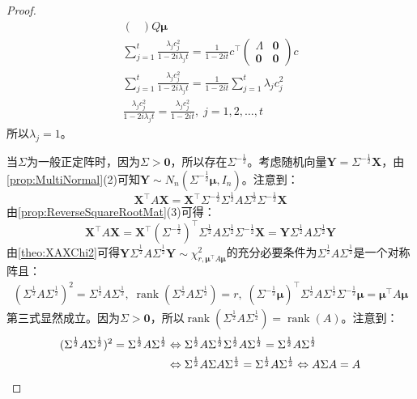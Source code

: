 \begin{proof}
\begin{gather*}
\begin{pmatrix}
		\end{pmatrix}
		Q\boldsymbol{\mu} \\
		\sum_{j=1}^{t}\frac{\lambda_jc_j^2}{1-2i\lambda_jt}=\frac{1}{1-2it}c^{\top}
		\begin{pmatrix}
			\varLambda & \mathbf{0} \\
			\mathbf{0} & \mathbf{0}
		\end{pmatrix}
		c \\
		\sum_{j=1}^{t}\frac{\lambda_jc_j^2}{1-2i\lambda_jt}=\frac{1}{1-2it}\sum_{j=1}^{t}\lambda_jc_j^2 \\
		\frac{\lambda_jc_j^2}{1-2i\lambda_jt}=\frac{\lambda_jc_j^2}{1-2it},\;j=1,2,\dots,t
	\end{gather*}
	所以$\lambda_j=1$。\par
	当$\Sigma$为一般正定阵时，因为$\Sigma>\mathbf{0}$，所以存在$\Sigma^{-\frac{1}{2}}$。考虑随机向量$\mathbf{Y}=\Sigma^{-\frac{1}{2}}\mathbf{X}$，由\cref{prop:MultiNormal}(2)可知$\mathbf{Y}\sim N_n(\Sigma^{-\frac{1}{2}}\boldsymbol{\mu},I_n)$。注意到：
	\begin{equation*}
		\mathbf{X}^{\top}A\mathbf{X}=\mathbf{X}^{\top}\Sigma^{-\frac{1}{2}}\Sigma
		^{\frac{1}{2}}A\Sigma^{\frac{1}{2}}\Sigma^{-\frac{1}{2}}\mathbf{X}
	\end{equation*}
	由\cref{prop:ReverseSquareRootMat}(3)可得：
	\begin{equation*}
		\mathbf{X}^{\top}A\mathbf{X}=\mathbf{X}^{\top}(\Sigma^{-\frac{1}{2}})^{\top}\Sigma
		^{\frac{1}{2}}A\Sigma^{\frac{1}{2}}\Sigma^{-\frac{1}{2}}\mathbf{X}=\mathbf{Y}\Sigma
		^{\frac{1}{2}}A\Sigma^{\frac{1}{2}}\mathbf{Y}
	\end{equation*}
	由\cref{theo:XAXChi2}可得$\mathbf{Y}\Sigma
	^{\frac{1}{2}}A\Sigma^{\frac{1}{2}}\mathbf{Y}\sim\chi_{r,\boldsymbol{\mu}^{\top}A\boldsymbol{\mu}}^2$的充分必要条件为$\Sigma
	^{\frac{1}{2}}A\Sigma^{\frac{1}{2}}$是一个对称阵且：
	\begin{gather*}
		(\Sigma
		^{\frac{1}{2}}A\Sigma^{\frac{1}{2}})^2=\Sigma
		^{\frac{1}{2}}A\Sigma^{\frac{1}{2}},\;
		\operatorname{rank}(\Sigma
		^{\frac{1}{2}}A\Sigma^{\frac{1}{2}})=r,\;
		(\Sigma^{-\frac{1}{2}}\boldsymbol{\mu})^{\top}\Sigma^{\frac{1}{2}} A\Sigma^{\frac{1}{2}}\Sigma^{-\frac{1}{2}}\boldsymbol{\mu}=\boldsymbol{\mu}^{\top}A\boldsymbol{\mu}
	\end{gather*}
	第三式显然成立。因为$\Sigma>\mathbf{0}$，所以$\operatorname{rank}(\Sigma
	^{\frac{1}{2}}A\Sigma^{\frac{1}{2}})=\operatorname{rank}(A)$。注意到：
	\begin{align*}
		(\Sigma
		^{\frac{1}{2}}A\Sigma^{\frac{1}{2}})^2=\Sigma
		^{\frac{1}{2}}A\Sigma^{\frac{1}{2}}&\Leftrightarrow
		\Sigma
		^{\frac{1}{2}}A\Sigma^{\frac{1}{2}}\Sigma
		^{\frac{1}{2}}A\Sigma^{\frac{1}{2}}=\Sigma
		^{\frac{1}{2}}A\Sigma^{\frac{1}{2}} \\
		&\Leftrightarrow
		\Sigma^{\frac{1}{2}}A\Sigma A\Sigma^{\frac{1}{2}}=\Sigma
		^{\frac{1}{2}}A\Sigma^{\frac{1}{2}}\Leftrightarrow
		A\Sigma A=A\qedhere
	\end{align*}
\end{proof}
